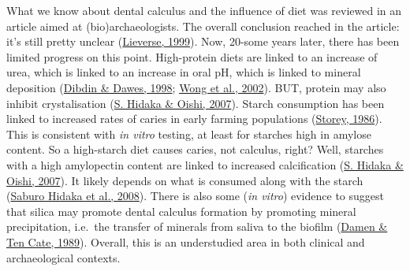 \documentclass[
  letterpaper,
]{book}
\begin{document}
What we know about dental calculus and the influence of diet was
reviewed in an article aimed at (bio)archaeologists. The overall
conclusion reached in the article: it's still pretty unclear
(\protect\hyperlink{ref-lieverseDietAetiology1999}{Lieverse, 1999}).
Now, 20-some years later, there has been limited progress on this point.
High-protein diets are linked to an increase of urea, which is linked to
an increase in oral pH, which is linked to mineral deposition
(\protect\hyperlink{ref-dibdinOralUrea1998}{Dibdin \& Dawes, 1998};
\protect\hyperlink{ref-wongCalciumPhosphate2002}{Wong et al., 2002}).
BUT, protein may also inhibit crystalisation
(\protect\hyperlink{ref-hidakaDietCalculus2007}{S. Hidaka \& Oishi,
2007}). Starch consumption has been linked to increased rates of caries
in early farming populations
(\protect\hyperlink{ref-storeyPaleopathologyOrigins1986}{Storey, 1986}).
This is consistent with \emph{in vitro} testing, at least for starches
high in amylose content. So a high-starch diet causes caries, not
calculus, right? Well, starches with a high amylopectin content are
linked to increased calcification
(\protect\hyperlink{ref-hidakaDietCalculus2007}{S. Hidaka \& Oishi,
2007}). It likely depends on what is consumed along with the starch
(\protect\hyperlink{ref-hidakaStarchRole2008}{Saburo Hidaka et al.,
2008}). There is also some (\emph{in vitro}) evidence to suggest that
silica may promote dental calculus formation by promoting mineral
precipitation, i.e.~the transfer of minerals from saliva to the biofilm
(\protect\hyperlink{ref-damenSilicicAcid1989}{Damen \& Ten Cate, 1989}).
Overall, this is an understudied area in both clinical and
archaeological contexts.
\end{document}
